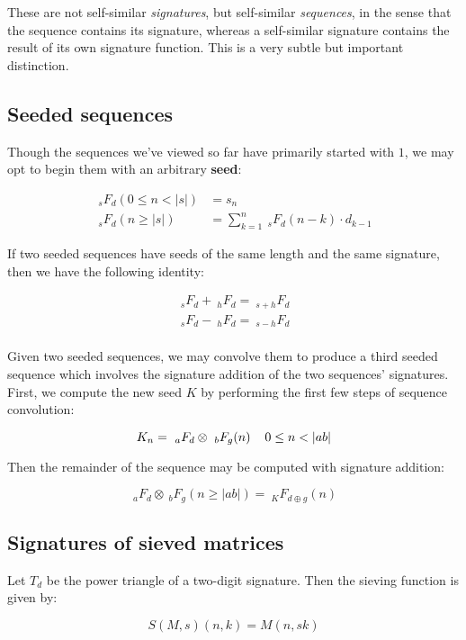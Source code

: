\documentclass{article}
\begin{document}
\noindent These are not self-similar \textit{signatures}, but self-similar \textit{sequences}, in the sense that the sequence contains its signature, whereas a self-similar signature contains the result of its own signature function. This is a very subtle but important distinction.

\subsection{Seeded sequences}

\noindent Though the sequences we've viewed so far have primarily started with $1$, we may opt to begin them with an arbitrary \textbf{seed}:

\begin{align*}
~_s F_d (0 \leq n < |s|) &= s_n\\
~_s F_d (n \geq |s|) &= \sum_{k=1}^{n}  ~_s F_d (n-k) \cdot d_{k-1}
\end{align*}

\noindent If two seeded sequences have seeds of the same length and the same signature, then we have the following identity:

\begin{align*}
~_s F_d + ~_h F_d = ~_{s + h} F_d\\
~_s F_d - ~_h F_d = ~_{s - h} F_d\\
\end{align*}

\noindent Given two seeded sequences, we may convolve them to produce a third seeded sequence which involves the signature addition of the two sequences' signatures. First, we compute the new seed $K$ by performing the first few steps of sequence convolution:

$$K_n = ~_a F_d \otimes ~_b F_g (n) \hspace{4mm} 0 \leq n < |ab|$$

\noindent Then the remainder of the sequence may be computed with signature addition:

$$~_a F_d \otimes ~_b F_g (n \geq |ab|) = ~_K F_{d \oplus g}(n)$$

\subsection{Signatures of sieved matrices}

Let $T_d$ be the power triangle of a two-digit signature. Then the sieving function is given by:

$$S(M, s)(n, k) = M(n, sk)$$
\end{document}
